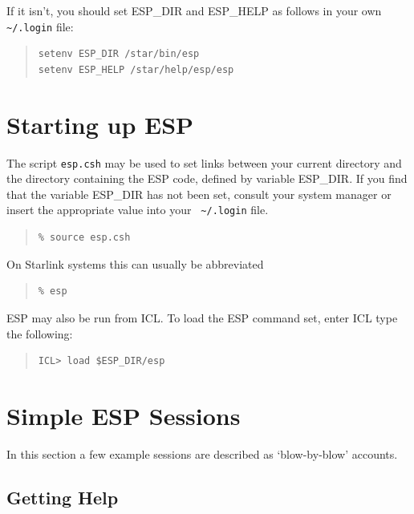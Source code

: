 \documentclass[twoside,11pt]{article}
\newenvironment{myquote}{\begin{quote}\begin{small}}{\end{small}\end{quote}}
\begin{document}
If it isn't, you should set ESP\_DIR and ESP\_HELP as follows in your own
{\verb+ ~/.login+} file:

\begin{myquote}
\begin{verbatim}
setenv ESP_DIR /star/bin/esp
setenv ESP_HELP /star/help/esp/esp
\end{verbatim}
\end{myquote}

\section{Starting up ESP}
\label{sec:starting}

The script {\tt esp.csh} may be used to set links between your current
directory and the directory containing the ESP code, defined by
variable ESP\_DIR.  If you find that the variable ESP\_DIR has not been
set, consult your system manager or insert the appropriate value into
your {\verb+ ~/.login+} file.

\begin{myquote}
\begin{verbatim}
% source esp.csh
\end{verbatim}
\end{myquote}
On Starlink systems this can usually be abbreviated
\begin{myquote}
\begin{verbatim}
% esp
\end{verbatim}
\end{myquote}

ESP may also be run from ICL. To load the ESP command set, enter ICL type
the following:

\begin{myquote}
\begin{verbatim}
ICL> load $ESP_DIR/esp
\end{verbatim}
\end{myquote}

\section{Simple ESP Sessions}
\label{sec:session}

In this section a few example sessions are described as `blow-by-blow'
accounts.


\subsection{Getting Help}
\end{document}

